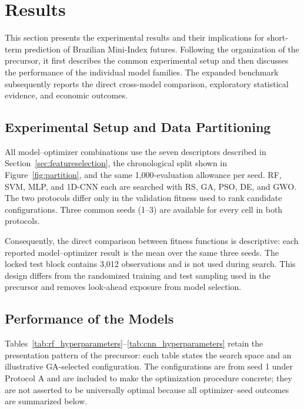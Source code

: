 \section{Results}\label{sec:results}

This section presents the experimental results and their implications for short-term prediction of Brazilian Mini-Index futures. Following the organization of the precursor, it first describes the common experimental setup and then discusses the performance of the individual model families. The expanded benchmark subsequently reports the direct cross-model comparison, exploratory statistical evidence, and economic outcomes.

\subsection{Experimental Setup and Data Partitioning}

All model--optimizer combinations use the seven descriptors described in Section~\ref{sec:featureselection}, the chronological split shown in Figure~\ref{fig:partition}, and the same 1,000-evaluation allowance per seed. RF, SVM, MLP, and 1D-CNN each are searched with RS, GA, PSO, DE, and GWO. The two protocols differ only in the validation fitness used to rank candidate configurations. Three common seeds (1--3) are available for every cell in both protocols.

Consequently, the direct comparison between fitness functions is descriptive: each reported model--optimizer result is the mean over the same three seeds. The locked test block contains 3,012 observations and is not used during search. This design differs from the randomized training and test sampling used in the precursor and removes look-ahead exposure from model selection.

\subsection{Performance of the Models}
\label{sec:performance_models}

Tables~\ref{tab:rf_hyperparameters}--\ref{tab:cnn_hyperparameters} retain the presentation pattern of the precursor: each table states the search space and an illustrative GA-selected configuration. The configurations are from seed 1 under Protocol A and are included to make the optimization procedure concrete; they are not asserted to be universally optimal because all optimizer--seed outcomes are summarized below.

